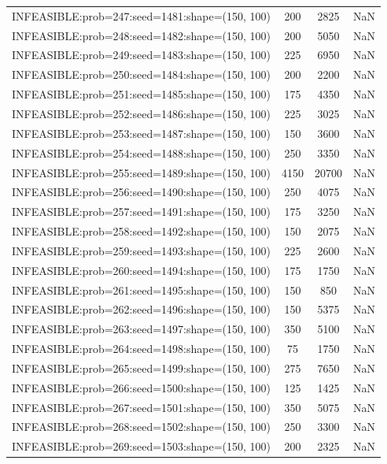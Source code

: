 \begin{longtable}{lccc}
INFEASIBLE:prob=247:seed=1481:shape=(150, 100) &      200 &  2825 &    NaN \\
INFEASIBLE:prob=248:seed=1482:shape=(150, 100) &      200 &  5050 &    NaN \\
INFEASIBLE:prob=249:seed=1483:shape=(150, 100) &      225 &  6950 &    NaN \\
INFEASIBLE:prob=250:seed=1484:shape=(150, 100) &      200 &  2200 &    NaN \\
INFEASIBLE:prob=251:seed=1485:shape=(150, 100) &      175 &  4350 &    NaN \\
INFEASIBLE:prob=252:seed=1486:shape=(150, 100) &      225 &  3025 &    NaN \\
INFEASIBLE:prob=253:seed=1487:shape=(150, 100) &      150 &  3600 &    NaN \\
INFEASIBLE:prob=254:seed=1488:shape=(150, 100) &      250 &  3350 &    NaN \\
INFEASIBLE:prob=255:seed=1489:shape=(150, 100) &     4150 & 20700 &    NaN \\
INFEASIBLE:prob=256:seed=1490:shape=(150, 100) &      250 &  4075 &    NaN \\
INFEASIBLE:prob=257:seed=1491:shape=(150, 100) &      175 &  3250 &    NaN \\
INFEASIBLE:prob=258:seed=1492:shape=(150, 100) &      150 &  2075 &    NaN \\
INFEASIBLE:prob=259:seed=1493:shape=(150, 100) &      225 &  2600 &    NaN \\
INFEASIBLE:prob=260:seed=1494:shape=(150, 100) &      175 &  1750 &    NaN \\
INFEASIBLE:prob=261:seed=1495:shape=(150, 100) &      150 &   850 &    NaN \\
INFEASIBLE:prob=262:seed=1496:shape=(150, 100) &      150 &  5375 &    NaN \\
INFEASIBLE:prob=263:seed=1497:shape=(150, 100) &      350 &  5100 &    NaN \\
INFEASIBLE:prob=264:seed=1498:shape=(150, 100) &       75 &  1750 &    NaN \\
INFEASIBLE:prob=265:seed=1499:shape=(150, 100) &      275 &  7650 &    NaN \\
INFEASIBLE:prob=266:seed=1500:shape=(150, 100) &      125 &  1425 &    NaN \\
INFEASIBLE:prob=267:seed=1501:shape=(150, 100) &      350 &  5075 &    NaN \\
INFEASIBLE:prob=268:seed=1502:shape=(150, 100) &      250 &  3300 &    NaN \\
INFEASIBLE:prob=269:seed=1503:shape=(150, 100) &      200 &  2325 &    NaN \\

\end{longtable}
